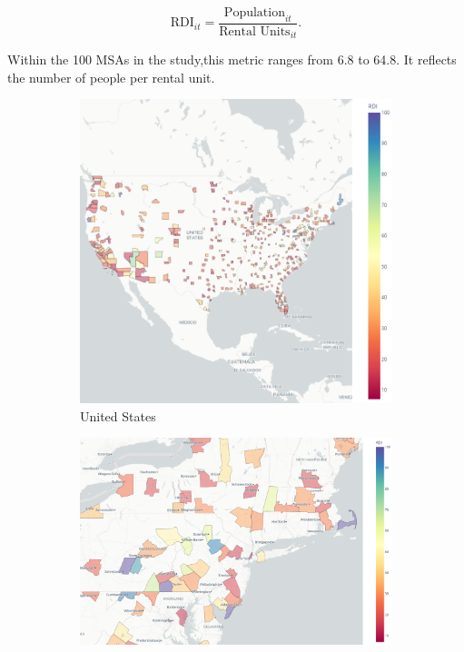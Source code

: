 \documentclass[APA,Times1COL]{WileyNJDv5} %
\begin{document}
\begin{equation*}
	\text{RDI}_{it} = \frac{\text{Population}_{it}}{\text{Rental Units}_{it}}.
\end{equation*}
	
Within the 100 MSAs in the study,this metric ranges from 6.8 to 64.8. It reflects the number of people per rental unit. 
\begin{figure}[hbt!]
	\centering
	
	\begin{subfigure}[b]{0.32\textwidth}
		\includegraphics[width=\linewidth]{us.png}
		\caption{United States}\label{fig:us_choropleth}
	\end{subfigure}\hfill
	\begin{subfigure}[b]{0.32\textwidth}
		\includegraphics[width=\linewidth]{tristate.png}

\end{subfigure}
\end{figure}
\end{document}
